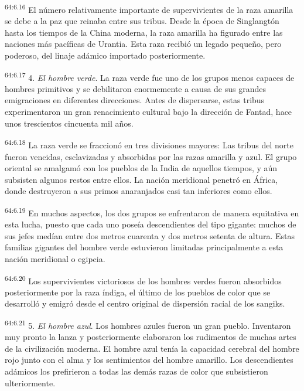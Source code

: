 \par
\textsuperscript{64:6.16} El número relativamente importante de supervivientes de la raza amarilla se debe a la paz que reinaba entre sus tribus. Desde la época de Singlangtón hasta los tiempos de la China moderna, la raza amarilla ha figurado entre las naciones más pacíficas de Urantia. Esta raza recibió un legado pequeño, pero poderoso, del linaje adámico importado posteriormente.

\par
\textsuperscript{64:6.17} 4. \textit{El hombre verde}. La raza verde fue uno de los grupos menos capaces de hombres primitivos y se debilitaron enormemente a causa de sus grandes emigraciones en diferentes direcciones. Antes de dispersarse, estas tribus experimentaron un gran renacimiento cultural bajo la dirección de Fantad, hace unos trescientos cincuenta mil años.

\par
\textsuperscript{64:6.18} La raza verde se fraccionó en tres divisiones mayores: Las tribus del norte fueron vencidas, esclavizadas y absorbidas por las razas amarilla y azul. El grupo oriental se amalgamó con los pueblos de la India de aquellos tiempos, y aún subsisten algunos restos entre ellos. La nación meridional penetró en África, donde destruyeron a sus primos anaranjados casi tan inferiores como ellos.

\par
\textsuperscript{64:6.19} En muchos aspectos, los dos grupos se enfrentaron de manera equitativa en esta lucha, puesto que cada uno poseía descendientes del tipo gigante: muchos de sus jefes medían entre dos metros cuarenta y dos metros setenta de altura. Estas familias gigantes del hombre verde estuvieron limitadas principalmente a esta nación meridional o egipcia.

\par
\textsuperscript{64:6.20} Los supervivientes victoriosos de los hombres verdes fueron absorbidos posteriormente por la raza índiga, el último de los pueblos de color que se desarrolló y emigró desde el centro original de dispersión racial de los sangiks.

\par
\textsuperscript{64:6.21} 5. \textit{El hombre azul}. Los hombres azules fueron un gran pueblo. Inventaron muy pronto la lanza y posteriormente elaboraron los rudimentos de muchas artes de la civilización moderna. El hombre azul tenía la capacidad cerebral del hombre rojo junto con el alma y los sentimientos del hombre amarillo. Los descendientes adámicos los prefirieron a todas las demás razas de color que subsistieron ulteriormente.


